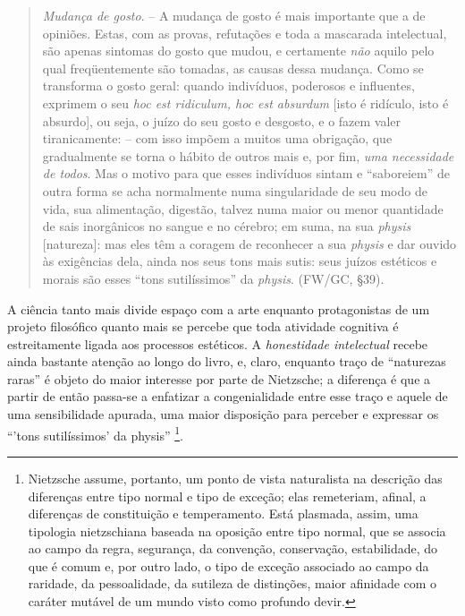 \documentclass[
	12pt,				%
	openright,			%
	oneside,			%
	a4paper,			%
	english,			%
	french,				%
	spanish,			%
	brazil				%
	]{abntex2}
\begin{document}
\begin{quotation}
\textit{Mudança de gosto}. – A mudança de gosto é mais importante que a de opiniões. Estas, com as provas, refutações e toda a mascarada intelectual, são apenas sintomas do gosto que mudou, e certamente \textit{não} aquilo pelo qual freqüentemente são tomadas, as causas dessa mudança. Como se transforma o gosto geral: quando indivíduos, poderosos e influentes, exprimem o seu \textit{hoc est ridiculum, hoc est absurdum} [isto é ridículo, isto é absurdo], ou seja, o juízo do seu gosto e desgosto, e o fazem valer tiranicamente: – com isso impõem a muitos uma obrigação, que gradualmente se torna o hábito de outros mais e, por fim, \textit{uma necessidade de todos}. Mas o motivo para que esses indivíduos sintam e “saboreiem” de outra forma se acha normalmente numa singularidade de seu modo de vida, sua alimentação, digestão, talvez numa maior ou menor quantidade de sais inorgânicos no sangue e no cérebro; em suma, na sua \textit{physis} [natureza]: mas eles têm a coragem de reconhecer a sua \textit{physis} e dar ouvido às exigências dela, ainda nos seus tons mais sutis: seus juízos estéticos e morais são esses “tons sutilíssimos” da \textit{physis}. (FW/GC, §39).
\end{quotation}

A ciência tanto mais divide espaço com a arte enquanto protagonistas de um projeto filosófico quanto mais se percebe que toda atividade cognitiva é estreitamente ligada aos processos estéticos. A \textit{honestidade intelectual} recebe ainda bastante atenção ao longo do livro, e, claro, enquanto traço de “naturezas raras” é objeto do maior interesse por parte de Nietzsche; a diferença é que a partir de então passa-se a enfatizar a congenialidade entre esse traço e aquele de uma sensibilidade apurada, uma maior disposição para perceber e expressar os “'tons sutilíssimos' da physis”
\footnote{Nietzsche assume, portanto, um ponto de vista naturalista na descrição das diferenças entre tipo normal e tipo de exceção; elas remeteriam, afinal, a diferenças de constituição e temperamento. Está plasmada, assim, uma tipologia nietzschiana baseada na oposição entre tipo normal, que se associa ao campo da regra, segurança, da convenção, conservação, estabilidade, do que é comum e, por outro lado, o tipo de exceção associado ao campo da raridade, da pessoalidade, da sutileza de distinções, maior afinidade com o caráter mutável de um mundo visto como profundo devir.}.
\end{document}
